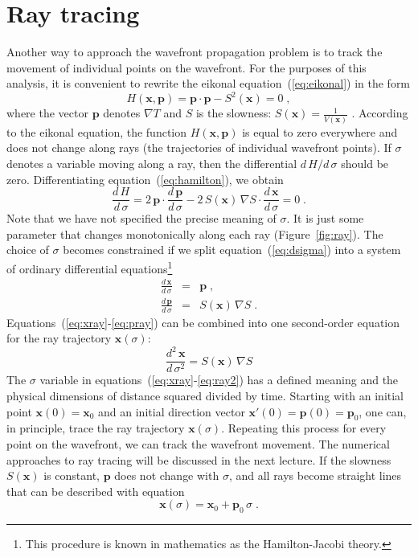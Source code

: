 \documentclass[12pt]{handout}
\begin{document}
\section{Ray tracing}
Another way to approach the wavefront propagation problem is to track
the movement of individual points on the wavefront. For the purposes
of this analysis, it is convenient to rewrite the eikonal
equation~(\ref{eq:eikonal}) in the form
\begin{equation}
  \label{eq:hamilton}
  H(\mathbf{x},\mathbf{p}) = \mathbf{p} \cdot \mathbf{p} - 
  S^2(\mathbf{x}) = 0\;,
\end{equation}
where the vector $\mathbf{p}$ denotes $\nabla T$ and $S$ is
the slowness: $S(\mathbf{x}) = \frac{1}{V(\mathbf{x})}$ . According to
the eikonal equation, the function $H(\mathbf{x},\mathbf{p})$ is equal
to zero everywhere and does not change along rays (the trajectories of
individual wavefront points). If $\sigma$ denotes a variable moving
along a ray, then the differential $d\,H/d\,\sigma$ should be
zero. Differentiating equation~(\ref{eq:hamilton}), we obtain
\begin{equation}
  \label{eq:dsigma}
  \frac{d\,H}{d\,\sigma} = 
  2\,\mathbf{p} \cdot \frac{d\,\mathbf{p}}{d\,\sigma} -
  2\,S(\mathbf{x})\,\nabla S \cdot \frac{d\,\mathbf{x}}{d\,\sigma} = 0\;.
\end{equation}
Note that we have not specified the precise meaning of $\sigma$. It
is just some parameter that changes monotonically along each ray
(Figure~\ref{fig:ray}). The choice of $\sigma$ becomes constrained if
we split equation~(\ref{eq:dsigma}) into a system of ordinary
differential equations\footnote{This procedure is known in mathematics
as the Hamilton-Jacobi theory.}
\begin{eqnarray}
  \label{eq:xray}
  \frac{d\,\mathbf{x}}{d\,\sigma} & = & \mathbf{p}\;, \\
  \label{eq:pray}
  \frac{d\,\mathbf{p}}{d\,\sigma} & = & S(\mathbf{x})\,\nabla S\;.
\end{eqnarray}
Equations~(\ref{eq:xray}-\ref{eq:pray}) can be combined into one
second-order equation for the ray trajectory $\mathbf{x}(\sigma)$:
\begin{equation}
  \label{eq:ray2}
  \frac{d^2\,\mathbf{x}}{d\,\sigma^2} =  S(\mathbf{x})\,\nabla S
\end{equation}
The $\sigma$ variable in equations~(\ref{eq:xray}-\ref{eq:ray2}) has a defined
meaning and the physical dimensions of distance squared divided by time.
Starting with an initial point $\mathbf{x}(0)=\mathbf{x}_0$ and an initial
direction vector $\mathbf{x}'(0)=\mathbf{p}(0)=\mathbf{p}_0$, one can, in
principle, trace the ray trajectory $\mathbf{x}(\sigma)$. Repeating this
process for every point on the wavefront, we can track the wavefront movement.
The numerical approaches to ray tracing will be discussed in the next lecture.
If the slowness $S(\mathbf{x})$ is constant, $\mathbf{p}$ does not change with
$\sigma$, and all rays become straight lines that can be described with 
equation
\begin{equation}
  \label{eq:straight}
  \mathbf{x}(\sigma) = \mathbf{x}_0 + \mathbf{p}_0\,\sigma\;.
\end{equation}
\end{document}
